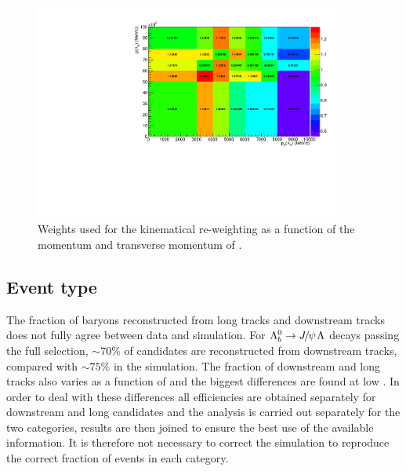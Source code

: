 \begin{figure}
\centering
\includegraphics[width=0.9\textwidth]{Lmumu/figs/ratio_Lb_p_pt.pdf}
 \caption{Weights used for the kinematical re-weighting as a function of the momentum and transverse momentum of \Lb. }
\label{fig:kinWeight}
\end{figure}

\subsection{Event type}

The fraction of \Lz baryons reconstructed from long tracks and downstream tracks does not fully agree between data and simulation.
For $\Lb\to\jpsi\Lz$ decays passing the full selection, $\sim 70\%$ of candidates are reconstructed from downstream tracks, 
compared with $\sim 75\%$ in the simulation.
The fraction of downstream and long tracks also varies as a function of \qsq and the biggest differences are found at low \qsq.
In order to deal with these differences all efficiencies are obtained separately for downstream and long candidates and the analysis is
carried out separately for the two categories, results are then joined to ensure the best use of the available information. 
It is therefore not necessary to correct the simulation to reproduce the correct fraction of events in each category.

